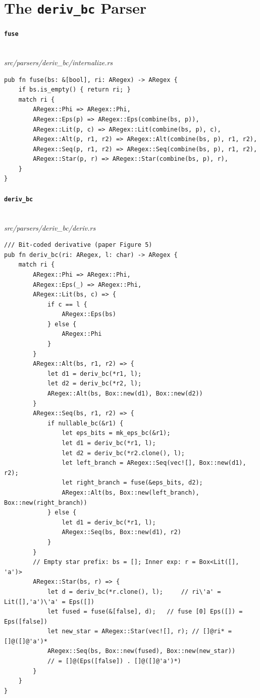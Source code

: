 \section{The \texttt{deriv\_bc} Parser}
\label{app:code-deriv-bc}

\paragraph{\texttt{fuse}}\ \\[-0.4em]
\textit{\small src/parsers/deriv\_bc/internalize.rs}
{\scriptsize\begin{verbatim}
pub fn fuse(bs: &[bool], ri: ARegex) -> ARegex {
    if bs.is_empty() { return ri; }
    match ri {
        ARegex::Phi => ARegex::Phi,
        ARegex::Eps(p) => ARegex::Eps(combine(bs, p)),
        ARegex::Lit(p, c) => ARegex::Lit(combine(bs, p), c),
        ARegex::Alt(p, r1, r2) => ARegex::Alt(combine(bs, p), r1, r2),
        ARegex::Seq(p, r1, r2) => ARegex::Seq(combine(bs, p), r1, r2),
        ARegex::Star(p, r) => ARegex::Star(combine(bs, p), r),
    }
}
\end{verbatim}}

\paragraph{\texttt{deriv\_bc}}\ \\[-0.4em]
\textit{\small src/parsers/deriv\_bc/deriv.rs}
{\scriptsize\begin{verbatim}
/// Bit-coded derivative (paper Figure 5)
pub fn deriv_bc(ri: ARegex, l: char) -> ARegex {
    match ri {
        ARegex::Phi => ARegex::Phi,
        ARegex::Eps(_) => ARegex::Phi,
        ARegex::Lit(bs, c) => {
            if c == l {
                ARegex::Eps(bs)
            } else {
                ARegex::Phi
            }
        }
        ARegex::Alt(bs, r1, r2) => {
            let d1 = deriv_bc(*r1, l);
            let d2 = deriv_bc(*r2, l);
            ARegex::Alt(bs, Box::new(d1), Box::new(d2))
        }
        ARegex::Seq(bs, r1, r2) => {
            if nullable_bc(&r1) {
                let eps_bits = mk_eps_bc(&r1);
                let d1 = deriv_bc(*r1, l);
                let d2 = deriv_bc(*r2.clone(), l);
                let left_branch = ARegex::Seq(vec![], Box::new(d1), r2);
                let right_branch = fuse(&eps_bits, d2);
                ARegex::Alt(bs, Box::new(left_branch), Box::new(right_branch))
            } else {
                let d1 = deriv_bc(*r1, l);
                ARegex::Seq(bs, Box::new(d1), r2)
            }
        }
        // Empty star prefix: bs = []; Inner exp: r = Box<Lit([], 'a')>
        ARegex::Star(bs, r) => {
            let d = deriv_bc(*r.clone(), l);     // ri\'a' = Lit([],'a')\'a' = Eps([])
            let fused = fuse(&[false], d);   // fuse [0] Eps([]) = Eps([false])
            let new_star = ARegex::Star(vec![], r); // []@ri* = []@([]@'a')*
            ARegex::Seq(bs, Box::new(fused), Box::new(new_star))
            // = []@(Eps([false]) . []@([]@'a')*)
        }
    }
}
\end{verbatim}}

